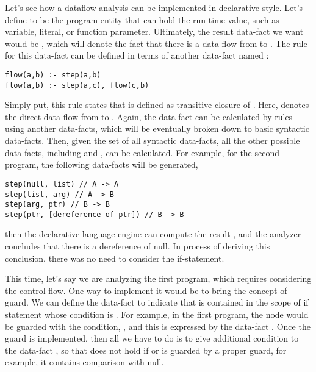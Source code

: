 Let's see how a dataflow analysis can be implemented in declarative style.
Let's define  to be the program entity that can hold the run-time
value, such as variable, literal, or function parameter.  Ultimately, the
result data-fact we want would be , which will denote the
fact that there is a data flow from  to . The
rule for this data-fact can be defined in terms of another data-fact named
:

\begin{lstlisting}[style=myDatalog,xleftmargin=2.5em]
flow(a,b) :- step(a,b)
flow(a,b) :- step(a,c), flow(c,b)
\end{lstlisting}

Simply put, this rule states that  is defined as transitive
closure of .  Here,  denotes the direct data
flow from  to . Again, the data-fact
 can be calculated by rules using another data-facts, which will
be eventually broken down to basic syntactic data-facts.  Then, given the set
of all syntactic data-facts, all the other possible data-facts, including
 and , can be calculated. For example, for the
second program, the following data-facts will be generated,

\begin{lstlisting}[style=myDatalog,xleftmargin=2.5em]
step(null, list) // A -> A
step(list, arg) // A -> B
step(arg, ptr) // B -> B
step(ptr, [dereference of ptr]) // B -> B
\end{lstlisting}

then the declarative language engine can compute the result , and the analyzer concludes that there is a dereference
of null. In process of deriving this conclusion, there was no need to consider
the if-statement.

This time, let's say we are analyzing the first program, which requires
considering the control flow.  One way to implement it would be to bring the
concept of guard. We can define the data-fact  to
indicate that  is contained in the scope of if statement whose
condition is .  For example, in the first program, the
 node would be guarded with the condition, ,
and this is expressed by the data-fact .
Once the guard is implemented, then all we have to do is to give additional
condition to the data-fact , so that  does not
hold if  or  is guarded by a proper guard, for example,
it contains comparison with null.

